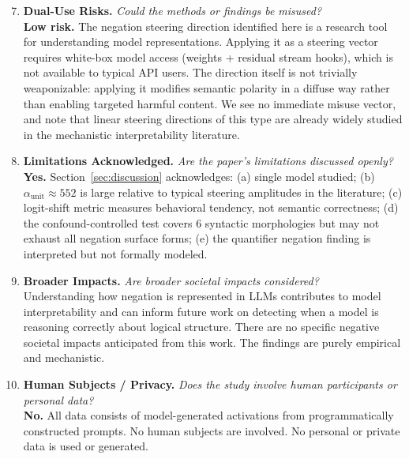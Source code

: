 \begin{enumerate}
\setcounter{enumi}{6}

\item \textbf{Dual-Use Risks.}
\textit{Could the methods or findings be misused?} \\
\textbf{Low risk.} The negation steering direction identified here is a research tool for understanding model representations. Applying it as a steering vector requires white-box model access (weights + residual stream hooks), which is not available to typical API users. The direction itself is not trivially weaponizable: applying it modifies semantic polarity in a diffuse way rather than enabling targeted harmful content. We see no immediate misuse vector, and note that linear steering directions of this type are already widely studied in the mechanistic interpretability literature.

\item \textbf{Limitations Acknowledged.}
\textit{Are the paper's limitations discussed openly?} \\
\textbf{Yes.} Section~\ref{sec:discussion} acknowledges: (a) single model studied; (b) $\alpha_{\mathrm{unit}} \approx 552$ is large relative to typical steering amplitudes in the literature; (c) logit-shift metric measures behavioral tendency, not semantic correctness; (d) the confound-controlled test covers 6 syntactic morphologies but may not exhaust all negation surface forms; (e) the quantifier negation finding is interpreted but not formally modeled.

\item \textbf{Broader Impacts.}
\textit{Are broader societal impacts considered?} \\
Understanding how negation is represented in LLMs contributes to model interpretability and can inform future work on detecting when a model is reasoning correctly about logical structure. There are no specific negative societal impacts anticipated from this work. The findings are purely empirical and mechanistic.

\item \textbf{Human Subjects / Privacy.}
\textit{Does the study involve human participants or personal data?} \\
\textbf{No.} All data consists of model-generated activations from programmatically constructed prompts. No human subjects are involved. No personal or private data is used or generated.

\end{enumerate}

